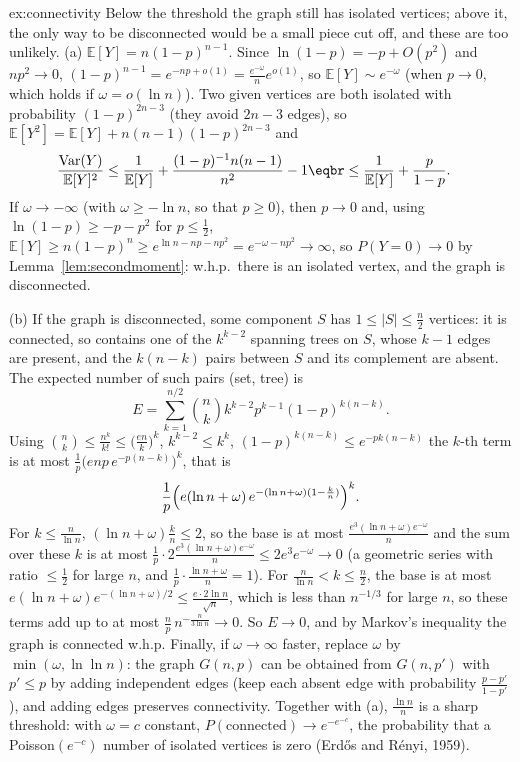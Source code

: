 \begin{solution}{ex:connectivity}
\idea Below the threshold the graph still has isolated vertices; above it, the only way to be disconnected would be a
small piece cut off, and these are too unlikely.
\writeup (a) $\mathbb E[Y]=n(1-p)^{n-1}$. Since $\ln(1-p)=-p+O(p^2)$ and $np^2\to0$, $(1-p)^{n-1}=e^{-np+o(1)}=\frac{e^{-\omega}}ne^{o(1)}$, so $\mathbb E[Y]\sim e^{-\omega}$ (when $p\to0$, which holds if $\omega=o(\ln n)$).
Two given vertices are both isolated with probability $(1-p)^{2n-3}$ (they avoid $2n-3$ edges), so $\mathbb E[Y^2]=\mathbb E[Y]+n(n-1)(1-p)^{2n-3}$ and
\[
\begin{aligned}\frac{\operatorname{Var}(Y)}{\mathbb E[Y]^2}&\le\frac1{\mathbb E[Y]}+\frac{(1-p)^{-1}n(n-1)}{n^2}-1\eqbr\le\frac1{\mathbb E[Y]}+\frac p{1-p}.\end{aligned}
\]
If $\omega\to-\infty$ (with $\omega\ge-\ln n$, so that $p\ge0$), then $p\to0$ and, using $\ln(1-p)\ge-p-p^2$ for $p\le\frac12$,
$\mathbb E[Y]\ge n(1-p)^n\ge e^{\ln n-np-np^2}=e^{-\omega-np^2}\to\infty$, so $P(Y=0)\to0$ by Lemma~\ref{lem:secondmoment}: w.h.p.\ there is an isolated vertex, and the graph is disconnected.

(b) If the graph is disconnected, some component $S$ has $1\le|S|\le\frac n2$ vertices: it is connected, so contains one of the $k^{k-2}$ spanning trees on $S$, whose
$k-1$ edges are present, and the $k(n-k)$ pairs between $S$ and its complement are absent. The expected number of such pairs (set, tree) is
\[
E=\sum_{k=1}^{n/2}\binom nkk^{k-2}p^{k-1}(1-p)^{k(n-k)}.
\]
Using $\binom nk\le\frac{n^k}{k!}\le\bigl(\frac{en}k\bigr)^k$, $k^{k-2}\le k^k$, $(1-p)^{k(n-k)}\le e^{-pk(n-k)}$ the $k$-th term is at most $\frac1p\bigl(enp\,e^{-p(n-k)}\bigr)^k$, that is
\[
\frac1p\Bigl(e(\ln n+\omega)\,e^{-(\ln n+\omega)(1-\frac kn)}\Bigr)^k.
\]
For $k\le\frac n{\ln n}$, $(\ln n+\omega)\frac kn\le2$, so the base is at most $\frac{e^3(\ln n+\omega)e^{-\omega}}n$ and the sum over these $k$ is at most $\frac1p\cdot2\frac{e^3(\ln n+\omega)e^{-\omega}}n\le2e^3e^{-\omega}\to0$
(a geometric series with ratio $\le\frac12$ for large $n$, and $\frac1p\cdot\frac{\ln n+\omega}n=1$). For $\frac n{\ln n}<k\le\frac n2$, the base is at most $e(\ln n+\omega)e^{-(\ln n+\omega)/2}\le\frac{e\cdot2\ln n}{\sqrt n}$, which is less
than $n^{-1/3}$ for large $n$, so these terms add up to at most $\frac n{p}\,n^{-\frac{n}{3\ln n}}\to0$. So $E\to0$, and by Markov's inequality the graph is connected w.h.p.
Finally, if $\omega\to\infty$ faster, replace $\omega$ by $\min(\omega,\ln\ln n)$: the graph $G(n,p)$ can be obtained from $G(n,p')$ with $p'\le p$ by adding
independent edges (keep each absent edge with probability $\frac{p-p'}{1-p'}$), and adding edges preserves connectivity. Together with (a), $\frac{\ln n}n$ is a
sharp threshold: with $\omega=c$ constant, $P(\text{connected})\to e^{-e^{-c}}$, the probability that a Poisson$(e^{-c})$ number of isolated vertices is zero (Erd\H os and R\'enyi, 1959).
\end{solution}

